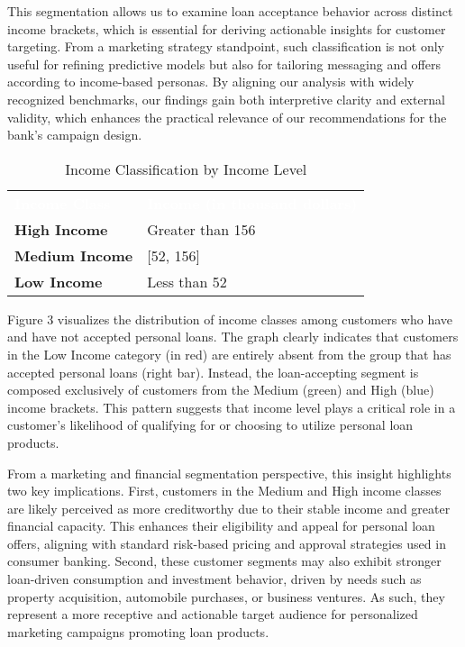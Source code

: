 \documentclass[12pt]{article}
\begin{document}
This segmentation allows us to examine loan acceptance behavior across distinct income brackets, which is essential for deriving actionable insights for customer targeting. From a marketing strategy standpoint, such classification is not only useful for refining predictive models but also for tailoring messaging and offers according to income-based personas. By aligning our analysis with widely recognized benchmarks, our findings gain both interpretive clarity and external validity, which enhances the practical relevance of our recommendations for the bank’s campaign design.
\begin{table}[ht]
\centering
{}
\renewcommand{\arraystretch}{1.5}
\begin{tabular}{|>{\bfseries}m{4cm}|m{6cm}|}
\rowcolor{blue!50}
\textcolor{white}{\textbf{Income Class}} & \textcolor{white}{\textbf{Income (in thousand dollars)}} \\
High Income   & Greater than 156 \\
Medium Income & [52, 156] \\
Low Income    & Less than 52 \\
\end{tabular}
\caption{Income Classification by Income Level}
\end{table}

Figure 3 visualizes the distribution of income classes among customers who have and have not accepted personal loans. The graph clearly indicates that customers in the Low Income category (in red) are entirely absent from the group that has accepted personal loans (right bar). Instead, the loan-accepting segment is composed exclusively of customers from the Medium (green) and High (blue) income brackets. This pattern suggests that income level plays a critical role in a customer's likelihood of qualifying for or choosing to utilize personal loan products.

From a marketing and financial segmentation perspective, this insight highlights two key implications. First, customers in the Medium and High income classes are likely perceived as more creditworthy due to their stable income and greater financial capacity. This enhances their eligibility and appeal for personal loan offers, aligning with standard risk-based pricing and approval strategies used in consumer banking. Second, these customer segments may also exhibit stronger loan-driven consumption and investment behavior, driven by needs such as property acquisition, automobile purchases, or business ventures. As such, they represent a more receptive and actionable target audience for personalized marketing campaigns promoting loan products.
\end{document}
